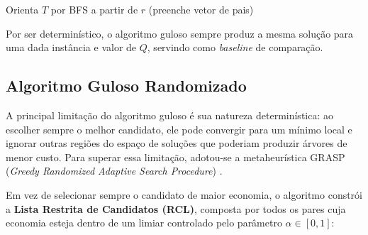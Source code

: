 \documentclass[12pt]{article}
\begin{document}
\begin{algorithm}[H]
\caption{Esau--Williams Guloso}
\label{algGuloso}

Orienta $T$ por BFS a partir de $r$ (preenche vetor de pais)\;
\end{algorithm}

Por ser determinístico, o algoritmo guloso sempre produz a mesma solução para uma dada instância e valor de $Q$, servindo como \textit{baseline} de comparação.

\subsection{Algoritmo Guloso Randomizado}
\label{subSecAlgRand}

A principal limitação do algoritmo guloso é sua natureza determinística: ao escolher sempre o melhor candidato, ele pode convergir para um mínimo local e ignorar outras regiões do espaço de soluções que poderiam produzir árvores de menor custo. Para superar essa limitação, adotou-se a metaheurística GRASP (\textit{Greedy Randomized Adaptive Search Procedure}) \cite{feo1995}.

Em vez de selecionar sempre o candidato de maior economia, o algoritmo constrói a \textbf{Lista Restrita de Candidatos (RCL)}, composta por todos os pares cuja economia esteja dentro de um limiar controlado pelo parâmetro $\alpha \in [0,1]$:
\end{document}

